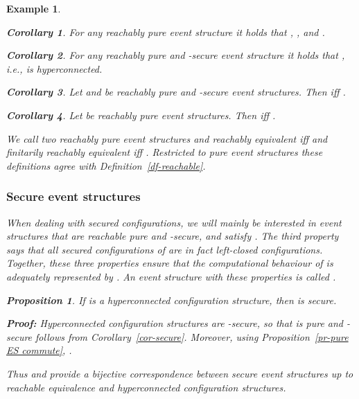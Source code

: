 \documentclass[twocolumn]{article}
\newtheorem{prop}{Proposition}[section]
\newtheorem{coro}{Corollary}
\newtheorem{exam}{Example}
\newenvironment{proposition}[1]{\begin{prop} \rm \label{pr-#1} }{\end{prop}}
\newenvironment{corollary}[1]{\begin{coro} \rm \label{cor-#1} }{\end{coro}}
\newenvironment{example}[1]{\begin{exam} \rm \label{ex-#1} }{\end{exam}}
\newenvironment{proof}{\begin{trivlist} \item[\hspace{\labelsep}\bf
Proof:]}{\hfill \end{trivlist}}
\newcommand{\df}[1]{Definition~\ref{df-#1}}
\newcommand{\pr}[1]{Proposition~\ref{pr-#1}}
\newcommand{\cor}[1]{Corollary~\ref{cor-#1}}
\newcommand{\phrase}[1]{\index{#1}{\em #1}}		\newcommand{\implies}{\Rightarrow}
\begin{document}
\begin{example}{causality}
\begin{corollary}{ES analogies}
For any reachably pure event structure  it holds that
, ,
 and .
\hfill 
\end{corollary}

\begin{corollary}{ES analogies secure}
For any reachably pure and -secure event structure  it holds that
, i.e.,  is hyperconnected.
\hfill 
\end{corollary}

\begin{corollary}{reachable equivalence ES}
Let  and  be reachably pure and -secure event structures.
Then  iff .
\hfill 
\end{corollary}

\begin{corollary}{finitary reachable equivalence ES}
Let  be reachably pure event structures.
Then  iff .
\hfill 
\end{corollary}
We call two reachably pure event structures  and 
\emph{reachably equivalent} iff  and
\emph{finitarily reachably equivalent}
iff .  Restricted to pure event structures
these definitions agree with \df{reachable}.

\subsubsection*{Secure event structures}\label{secure}

When dealing with secured configurations, we will mainly be interested
in event structures  that are reachable pure and
-secure, and satisfy .
The third property says that all secured configurations of  are in
fact left-closed configurations. Together, these three properties ensure that the
computational behaviour of  is adequately represented by .
An event structure with these properties is called \phrase{secure}.

\begin{proposition}{hyperconnected secure}
If  is a hyperconnected configuration structure, then 
is secure.
\end{proposition}

\begin{proof}
Hyperconnected configuration structures are -secure, so
that  is pure and -secure follows from \cor{secure}.
Moreover, using \pr{pure ES commute},
.
\end{proof}
Thus  and  provide a bijective correspondence between secure
event structures up to reachable equivalence and hyperconnected
configuration structures.


\end{example}
\end{document}
